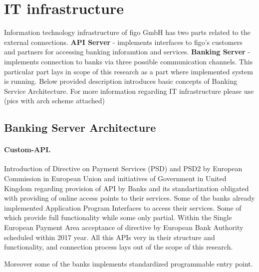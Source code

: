 \section{IT infrastructure}
Information technology infrastructure of figo GmbH has two parts related to the external connections. \textbf{API Server} - implements interfaces to figo's customers and partners for accessing banking inforamtion and services. \textbf{Banking Server} - implements connection to banks via three possible communication channels. This particular part lays in scope of this research as a part where implemented system is running. Below provided description introduces basic concepts of Banking Service Architecture. For more information regarding IT infrastructure please use (pics with arch scheme attached)
	\subsection{Banking Server Architecture}
	\paragraph{Custom-API.} Introduction of Directive on Payment Services (PSD) and PSD2 by European Commission in European Union and initiatives of Government in United Kingdom regarding provision of API by Banks and its standartization obligated with providing of online access points to their services.\cite{LarsAPI}\cite{TimAPI}\cite{DaveAPI} Some of the banks already implemented Application Program Interfaces to access their services. Some of which provide full functionality while some only partial. Within the Single European Payment Area acceptance of directive by European Bank Authority scheduled within 2017 year. \cite{PSD2} All this APIs very in their structure and functionality, and connection process lays out of the scope of this research.
	
Moreover some of the banks implements standardized programmable entry point. 
	
